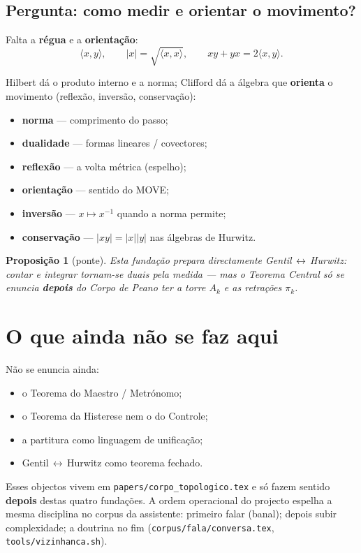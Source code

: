 \documentclass[11pt,a4paper]{article}
\newtheorem{proposicao}{Proposição}
\newcommand{\code}[1]{\texttt{\small #1}}
\begin{document}
\subsection*{Pergunta: como medir e orientar o movimento?}

Falta a \textbf{régua} e a \textbf{orientação}:
\[
\boxed{
\langle x,y\rangle,\qquad
|x|=\sqrt{\langle x,x\rangle},\qquad
xy+yx=2\langle x,y\rangle.
}
\]

\noindent Hilbert dá o produto interno e a norma; Clifford dá a álgebra
que \textbf{orienta} o movimento (reflexão, inversão, conservação):
\begin{itemize}
\item \textbf{norma} --- comprimento do passo;
\item \textbf{dualidade} --- formas lineares / covectores;
\item \textbf{reflexão} --- a volta métrica (espelho);
\item \textbf{orientação} --- sentido do MOVE;
\item \textbf{inversão} --- $x\mapsto x^{-1}$ quando a norma permite;
\item \textbf{conservação} --- $|xy|=|x||y|$ nas álgebras de Hurwitz.
\end{itemize}

\begin{proposicao}[ponte]
Esta fundação prepara directamente Gentil\,$\leftrightarrow$\,Hurwitz:
contar e integrar tornam-se duais \emph{pela medida} --- mas o Teorema
Central só se enuncia \textbf{depois} do Corpo de Peano ter a torre
$A_k$ e as retrações $\pi_k$.
\end{proposicao}

\section{O que ainda não se faz aqui}\label{sec:fund-nao}

Não se enuncia ainda:
\begin{itemize}
\item o Teorema do Maestro / Metrónomo;
\item o Teorema da Histerese nem o do Controle;
\item a partitura como linguagem de unificação;
\item Gentil\,$\leftrightarrow$\,Hurwitz como teorema fechado.
\end{itemize}
Esses objectos vivem em \code{papers/corpo\_topologico.tex} e só fazem
sentido \textbf{depois} destas quatro fundações. A ordem operacional
do projecto espelha a mesma disciplina no corpus da assistente:
primeiro falar (banal); depois subir complexidade; a doutrina no fim
(\code{corpus/fala/conversa.tex}, \code{tools/vizinhanca.sh}).
\end{document}
